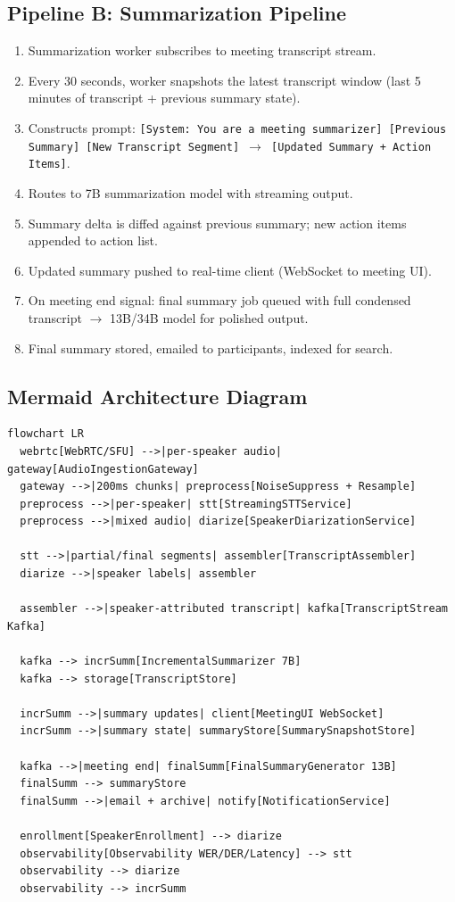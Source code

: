 \subsection*{Pipeline B: Summarization Pipeline}

\begin{enumerate}
  \item Summarization worker subscribes to meeting transcript stream.
  \item Every 30 seconds, worker snapshots the latest transcript window (last 5 minutes of transcript + previous summary state).
  \item Constructs prompt: \texttt{[System: You are a meeting summarizer] [Previous Summary] [New Transcript Segment] $\rightarrow$ [Updated Summary + Action Items]}.
  \item Routes to 7B summarization model with streaming output.
  \item Summary delta is diffed against previous summary; new action items appended to action list.
  \item Updated summary pushed to real-time client (WebSocket to meeting UI).
  \item On meeting end signal: final summary job queued with full condensed transcript $\rightarrow$ 13B/34B model for polished output.
  \item Final summary stored, emailed to participants, indexed for search.
\end{enumerate}

\subsection*{Mermaid Architecture Diagram}

\begin{verbatim}
flowchart LR
  webrtc[WebRTC/SFU] -->|per-speaker audio| gateway[AudioIngestionGateway]
  gateway -->|200ms chunks| preprocess[NoiseSuppress + Resample]
  preprocess -->|per-speaker| stt[StreamingSTTService]
  preprocess -->|mixed audio| diarize[SpeakerDiarizationService]

  stt -->|partial/final segments| assembler[TranscriptAssembler]
  diarize -->|speaker labels| assembler

  assembler -->|speaker-attributed transcript| kafka[TranscriptStream Kafka]

  kafka --> incrSumm[IncrementalSummarizer 7B]
  kafka --> storage[TranscriptStore]

  incrSumm -->|summary updates| client[MeetingUI WebSocket]
  incrSumm -->|summary state| summaryStore[SummarySnapshotStore]

  kafka -->|meeting end| finalSumm[FinalSummaryGenerator 13B]
  finalSumm --> summaryStore
  finalSumm -->|email + archive| notify[NotificationService]

  enrollment[SpeakerEnrollment] --> diarize
  observability[Observability WER/DER/Latency] --> stt
  observability --> diarize
  observability --> incrSumm
\end{verbatim}

